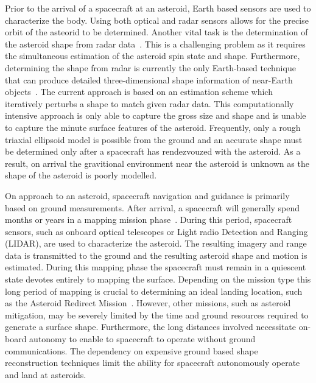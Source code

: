\documentclass[letterpaper, paper,11pt]{AAS}		%
\begin{document}
Prior to the arrival of a spacecraft at an asteroid, Earth based sensors are used to characterize the body.
Using both optical and radar sensors allows for the precise orbit of the asteorid to be determined.
Another vital task is the determination of the asteroid shape from radar data~\cite{hudson1994,busch2011}.
This is a challenging problem as it requires the simultaneous estimation of the asteroid spin state and shape.
Furthermore, determining the shape from radar is currently the only Earth-based technique that can produce detailed three-dimensional shape information of near-Earth objects~\cite{greenberg2015}.
The current approach is based on an estimation scheme which iteratively perturbs a shape to match given radar data.
This computationally intensive approach is only able to capture the gross size and shape and is unable to capture the minute surface features of the asteroid.
Frequently, only a rough triaxial ellipsoid model is possible from the ground and an accurate shape must be determined only after a spacecraft has rendezvouzed with the asteroid.
As a result, on arrival the gravitional environment near the asteroid is unknown as the shape of the asteroid is poorly modelled.

On approach to an asteroid, spacecraft navigation and guidance is primarily based on ground measurements.
After arrival, a spacecraft will generally spend months or years in a mapping mission phase~\cite{kubota2003,cole1998}.
During this period, spacecraft sensors, such as onboard optical telescopes or Light radio Detection and Ranging (LIDAR), are used to characterize the asteroid.
The resulting imagery and range data is transmitted to the ground and the resulting asteroid shape and motion is estimated. 
During this mapping phase the spacecraft must remain in a quiescent state devotes entirely to mapping the surface.
Depending on the mission type this long period of mapping is crucial to determining an ideal landing location, such as the Asteroid Redirect Mission~\cite{gates2015}. 
However, other missions, such as asteroid mitigation, may be severely limited by the time and ground resources required to generate a surface shape.
Furthermore, the long distances involved necessitate on-board autonomy to enable to spacecraft to operate without ground communications.
The dependency on expensive ground based shape reconstruction techniques limit the ability for spacecraft autonomously operate and land at asteroids.
\end{document}
